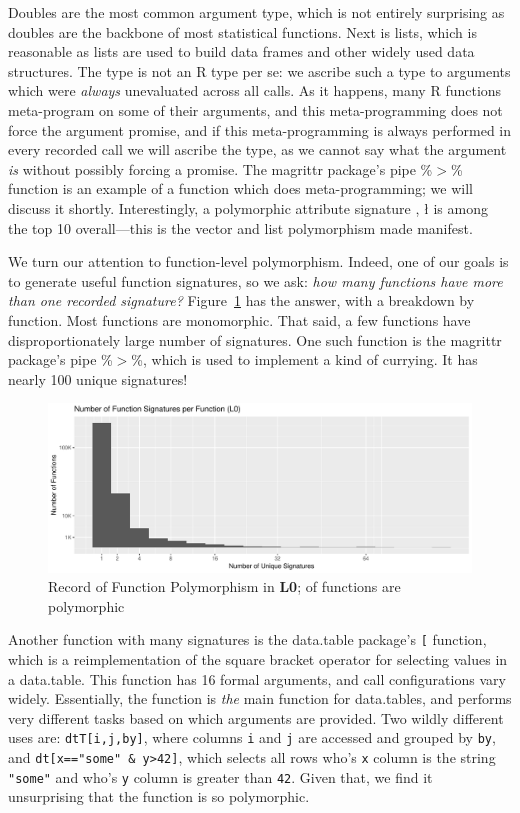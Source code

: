 \documentclass[acmsmall,10pt,review,anonymous]{acmart}\settopmatter{printfolios=true,printccs=false,printacmref=false}
\newcommand{\code}[1]{\lstinline|#1|\xspace}
\begin{document}
Doubles are the most common argument type, which is not entirely surprising
as doubles are the backbone of most statistical functions.  Next is lists,
which is reasonable as lists are used to build data frames and other widely
used data structures.  The \ANY type is not an R type per se: we ascribe
such a type to arguments which were {\it always} unevaluated across all
calls.  As it happens, many R functions meta-program on some of their
arguments, and this meta-programming does not force the argument promise,
and if this meta-programming is always performed in every recorded call we
will ascribe the \ANY type, as we cannot say what the argument {\it is}
without possibly forcing a promise.  The magrittr package's pipe \%$>$\%
function is an example of a function which does meta-programming; we will
discuss it shortly.  Interestingly, a polymorphic attribute signature \D, \l
is among the top 10 overall---this is the vector and list polymorphism made
manifest.

We turn our attention to function-level polymorphism.  Indeed, one of our
goals is to generate useful function signatures, so we ask: {\it how many
  functions have more than one recorded signature?}
Figure~\ref{fig:L0funcounts} has the answer, with a breakdown by function.
Most functions are monomorphic.  That said, a few functions have
disproportionately large number of signatures.  One such function is the
magrittr package's pipe \%$>$\%, which is used to implement a kind of
currying. It has nearly 100 unique signatures!  

\begin{figure}[htbp]\begin{center}
\includegraphics[width=.9\textwidth]{L0_by_fun}
\caption{Record of Function Polymorphism in {\bf L0}; \LZEROPERCPOLY of
  functions are polymorphic}
\label{fig:L0funcounts}\end{center}
\end{figure}

Another function with many signatures is the data.table package's \code{[}
  function, which is a reimplementation of the square bracket operator for
  selecting values in a data.table.  This function has 16 formal arguments,
  and call configurations vary widely.  Essentially, the function is {\it
    the} main function for data.tables, and performs very different tasks
  based on which arguments are provided.  Two wildly different uses are:
  \code{dtT[i,j,by]}, where columns \code{i} and \code{j} are accessed and
  grouped by \code{by}, and \code{dt[x=="some" & y>42]}, which selects
  all rows who's \code{x} column is the string \code{"some"} and who's
  \code{y} column is greater than \code{42}.  Given that, we find it
  unsurprising that the function is so polymorphic.
\end{document}
